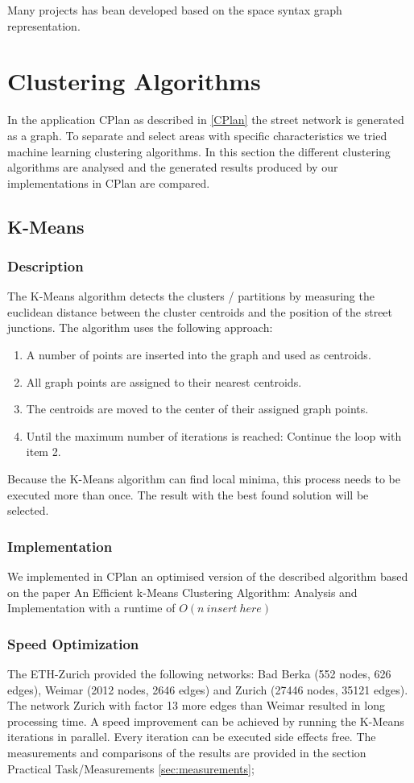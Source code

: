 \documentclass[11pt, a4paper]{report}
\begin{document}
Many projects has bean developed based on the space syntax graph representation. 

\pagebreak
\section{Clustering Algorithms}
In the application CPlan as described in \ref{CPlan} the street network is generated as a graph. To separate and select areas with specific characteristics we tried machine learning clustering algorithms. In this section the different clustering algorithms are analysed and the generated results produced by our implementations in CPlan are compared.
\subsection{K-Means}
\subsubsection{Description}
The K-Means algorithm detects the clusters / partitions by measuring the euclidean distance between the cluster centroids and the position of the street junctions. The algorithm uses the following approach:

\begin{enumerate}
    \item A number of points are inserted into the graph and used as centroids.
    \item All graph points are assigned to their nearest centroids.
    \item The centroids are moved to the center of their assigned graph points.
    \item Until the maximum number of iterations is reached: Continue the loop with item 2.
\end{enumerate}
Because the K-Means algorithm can find local minima, this process needs to be executed more than once. The result with the best found solution will be selected.

\subsubsection{Implementation}
We implemented in CPlan\citep{cPlan:2015} an optimised version of the described algorithm based on the paper An Efficient k-Means Clustering Algorithm: Analysis and Implementation \cite{kmeans:2002} with a runtime of $O(n\ insert\ here)$

\subsubsection{Speed Optimization}
The ETH-Zurich provided the following networks: Bad Berka (552 nodes, 626 edges), Weimar (2012 nodes, 2646 edges) and Zurich (27446 nodes, 35121 edges). The network Zurich with factor 13 more edges than Weimar resulted in long processing time. A speed improvement can be achieved by running the K-Means iterations in parallel. Every iteration can be executed side effects free. The measurements and comparisons of the results are provided in the section Practical Task/Measurements \ref{sec:measurements};
\end{document}
